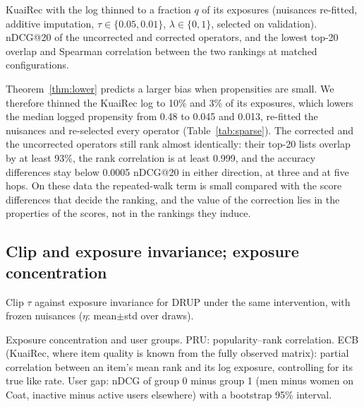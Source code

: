 \begin{table}[t]\centering\small
\caption{KuaiRec with the log thinned to a fraction $q$ of its exposures
(nuisances re-fitted, additive imputation, $\tau\in\{0.05,0.01\}$, $\lambda\in\{0,1\}$,
selected on validation). nDCG@20 of the uncorrected and corrected operators, and
the lowest top-20 overlap and Spearman correlation between the two rankings at
matched configurations.}\label{tab:sparse}
\begin{adjustbox}{max width=\textwidth}

\end{adjustbox}
\end{table}

Theorem~\ref{thm:lower} predicts a larger bias when propensities are small. We
therefore thinned the KuaiRec log to 10\% and 3\% of its exposures, which lowers the
median logged propensity from 0.48 to 0.045 and 0.013, re-fitted the nuisances
and re-selected every operator (Table~\ref{tab:sparse}). The corrected and the
uncorrected operators still rank almost identically: their top-20 lists overlap
by at least 93\%, the rank correlation is at least 0.999, and the accuracy
differences stay below 0.0005 nDCG@20 in either direction, at three and at five
hops. On these data the repeated-walk term is small compared with the score
differences that decide the ranking, and the value of the correction lies in
the properties of the scores, not in the rankings they induce.


\subsection{Clip and exposure invariance; exposure concentration}\label{sec:fairsupp}
\begin{table}[t]\centering\small
\caption{Clip $\tau$ against exposure invariance for DRUP under the same
intervention, with frozen nuisances ($\eta$: mean$\pm$std over draws).}\label{tab:tau}
\begin{adjustbox}{max width=\textwidth}

\end{adjustbox}
\end{table}

\begin{table}[t]\centering\small
\caption{Exposure concentration and user groups. PRU: popularity--rank
correlation. ECB (KuaiRec, where item quality is known from the fully observed
matrix): partial correlation between an item's mean rank and its log exposure,
controlling for its true like rate. User gap: nDCG of group 0 minus group 1
(men minus women on Coat, inactive minus active users elsewhere) with a
bootstrap 95\% interval.}\label{tab:fair}
\begin{adjustbox}{max width=\textwidth}

\end{adjustbox}
\end{table}

